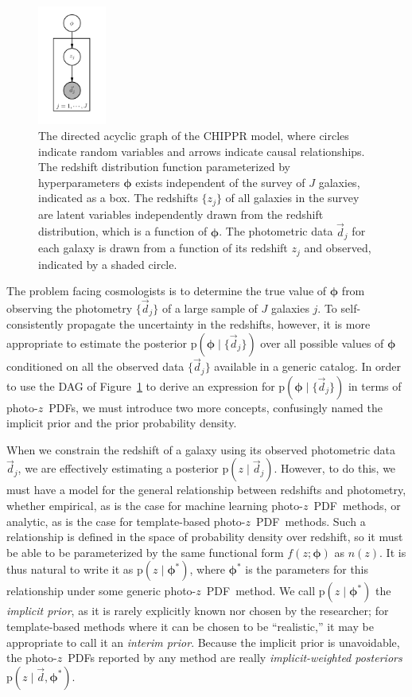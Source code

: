 \documentclass[iop]{emulateapj}
\newcommand{\Fig}[1]{Figure~\ref{#1}}
\newcommand{\nz}{$n(z)$}
\newcommand{\data}{\ensuremath{\vec{d}}}
\newcommand{\pr}[1]{\ensuremath{\mathrm{p}(#1)}}
\newcommand{\gvn}{\mid}%
\newcommand{\pz}{photo-$z$~}
\newcommand{\pzpdf}{\pz PDF}
\newcommand{\bvec}[1]{{\ensuremath{\boldsymbol{#1}}}}
\newcommand{\ndphi}{\bvec{\phi}}
\begin{document}
\begin{figure}
	\begin{center}
		\includegraphics[width=0.2\textwidth]{figures/chippr/pgm.png}
		\caption{The directed acyclic graph of the CHIPPR model, where 
circles indicate random variables and arrows indicate causal relationships.
			The redshift distribution function parameterized by 
hyperparameters $\ndphi$ exists independent of the survey of $J$ galaxies, 
indicated as a box.  
			The redshifts $\{z_{j}\}$ of all galaxies in the survey 
are latent variables independently drawn from the redshift distribution, which 
is a function of $\ndphi$. 
			The photometric data $\data_{j}$ for each galaxy is 
drawn from a function of its redshift $z_{j}$ and observed, indicated by a 
shaded circle.}
		\label{fig:pgm}
	\end{center}
\end{figure}

The problem facing cosmologists is to determine the true value of $\ndphi$ from 
observing the photometry $\{\data_{j}\}$ of a large sample of $J$ galaxies $j$.
To self-consistently propagate the uncertainty in the redshifts, however, it is 
more appropriate to estimate the posterior $\pr{\ndphi \gvn \{\data_{j}\}}$ 
over all possible values of $\ndphi$ conditioned on all the observed data 
$\{\data_{j}\}$ available in a generic catalog.
In order to use the DAG of \Fig{fig:pgm} to derive an expression for 
$\pr{\ndphi \gvn \{\data_{j}\}}$ in terms of \pzpdf s, we must introduce two 
more concepts, confusingly named the implicit prior and the prior probability 
density.

When we constrain the redshift of a galaxy using its observed photometric data 
$\data_{j}$, we are effectively estimating a posterior $\pr{z \gvn \data_{j}}$.
However, to do this, we must have a model for the general relationship between 
redshifts and photometry, whether empirical, as is the case for machine 
learning \pzpdf\ methods, or analytic, as is the case for template-based 
\pzpdf\ methods.
Such a relationship is defined in the space of probability density over 
redshift, so it must be able to be parameterized by the same functional form 
$f(z; \ndphi)$ as \nz .
It is thus natural to write it as $\pr{z \gvn \ndphi^{*}}$, where $\ndphi^{*}$ 
is the parameters for this relationship under some generic \pzpdf\ method.
We call $\pr{z \gvn \ndphi^{*}}$ the \textit{implicit prior}, as it is rarely 
explicitly known nor chosen by the researcher; for template-based methods where 
it can be chosen to be ``realistic,'' it may be appropriate to call it an 
\textit{interim prior}.
Because the implicit prior is unavoidable, the \pzpdf s reported by any method 
are really \textit{implicit-weighted posteriors} $\pr{z \gvn \data, 
\ndphi^{*}}$.
\end{document}
